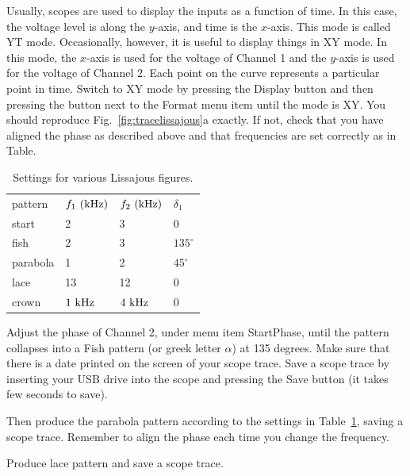 Usually, scopes are used to display the inputs as a function of time.
In this case, the voltage level is along the $y$-axis, and time is the
$x$-axis.  This mode is called YT mode.  Occasionally, however, it is
useful to display things in XY mode.  In this mode, the $x$-axis is
used for the voltage of Channel 1 and the $y$-axis is used for the
voltage of Channel 2.  Each point on the curve represents a particular
point in time.  Switch to XY mode by pressing the Display button and
then pressing the button next to the Format menu item until the mode
is XY.  You should reproduce Fig.~\ref{fig:tracelissajous}a
exactly.  If not, check that you have aligned the phase as described
above and that frequencies are set correctly as in Table.

\begin{table}
\begin{center}
\caption{Settings for various Lissajous figures.}
\label{tbl:lissajous}
\begin{tabular}{llll}
pattern & $f_1~\rm(kHz)$ & $f_2~\rm(kHz)$ & $\delta_1$ \\
start & 2 & 3 & 0 \\
fish & 2 & 3 & $135^\circ$ \\
parabola & 1 & 2 & $45^\circ$ \\
lace & 13 & 12 & 0 \\
crown & $1~\rm kHz$ & $4~\rm kHz$ & 0 \\
\end{tabular}
\end{center}
\end{table}

\begin{plot} Adjust the phase of Channel 2, under menu item StartPhase, until the
pattern collapses into a Fish pattern (or greek letter $\alpha$) at
135 degrees. Make sure that there is a date printed on the screen of your scope trace.  Save a scope trace by inserting your USB drive into the
scope and pressing the Save button (it takes few seconds to save).  \end{plot}

 \begin{plot}Then produce the parabola pattern  according to the settings in Table~\ref{tbl:lissajous}, saving a scope
trace.  Remember to align the phase each time you change the frequency.\end{plot}
\begin{plot} Produce lace pattern and save a scope trace. \end{plot}


